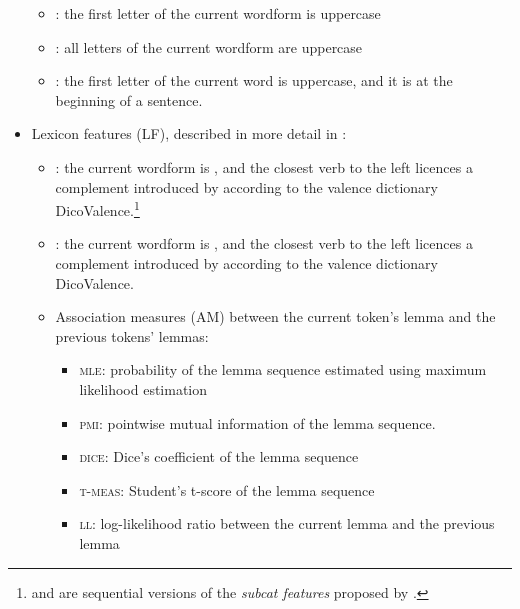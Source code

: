 \documentclass[output=paper,
modfonts
]{langscibook}
\begin{document}
\begin{itemize}
\begin{itemize}
\item {}: the first letter of the current wordform  is uppercase
\item {}: all letters of the current wordform  are uppercase
\item {}: the first letter of the current word  is uppercase, and it is at the beginning of a sentence.
\end{itemize}
\item Lexicon features %
({\textsc LF}), described in more detail in :
\begin{itemize}
\item {}: the current wordform  is , and the closest verb to the left licences a complement introduced by  according to the valence dictionary DicoValence.\footnote{ and  are sequential versions of the \emph{subcat features} proposed by \citet{nasr:acl:2015}.}
\item {}: the current wordform  is , and the closest verb to the left licences a complement introduced by  according to the valence dictionary DicoValence.
\item Association measures (\textsc{AM}) between the current token's lemma  and the previous tokens' lemmas:
\begin{itemize}
\item \textsc{mle}: probability of the lemma sequence estimated using maximum likelihood estimation
\item \textsc{pmi}: pointwise mutual information of the lemma sequence.
\item \textsc{dice}: Dice's coefficient of the lemma sequence
\item \textsc{t-meas}: Student's t-score of the lemma sequence
\item \textsc{ll}: log-likelihood ratio between the current lemma and the previous lemma
\end{itemize}
\end{itemize}
\end{itemize}
\end{document}
